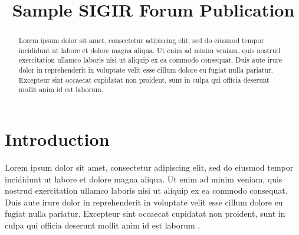 \documentclass[paper]{sigirforum}
\begin{document}
\title{Sample SIGIR Forum Publication}


\maketitle 
\begin{abstract}
Lorem ipsum dolor sit amet, consectetur adipiscing elit, sed do eiusmod tempor incididunt ut labore et dolore magna aliqua. Ut enim ad minim veniam, quis nostrud exercitation ullamco laboris nisi ut aliquip ex ea commodo consequat. Duis aute irure dolor in reprehenderit in voluptate velit esse cillum dolore eu fugiat nulla pariatur. Excepteur sint occaecat cupidatat non proident, sunt in culpa qui officia deserunt mollit anim id est laborum.
\end{abstract}

\section{Introduction}

Lorem ipsum dolor sit amet, consectetur adipiscing elit, sed do eiusmod tempor incididunt ut labore et dolore magna aliqua. Ut enim ad minim veniam, quis nostrud exercitation ullamco laboris nisi ut aliquip ex ea commodo consequat. Duis aute irure dolor in reprehenderit in voluptate velit esse cillum dolore eu fugiat nulla pariatur. Excepteur sint occaecat cupidatat non proident, sunt in culpa qui officia deserunt mollit anim id est laborum \citep{forum}.


\end{document}
